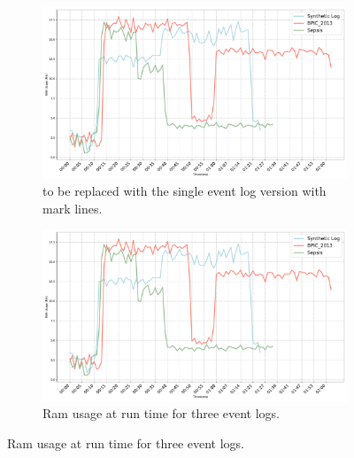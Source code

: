 \begin{figure}[ht]
\centering
\begin{subfigure}{0.49\textwidth}
  \centering
  \includegraphics[width=\textwidth]{content/figures/Ram_usage_per_TS_combined.pdf}
  \caption{to be replaced with the single event log version with mark lines.}
  \label{snr_a}
\end{subfigure}\hfill
\begin{subfigure}{0.49\textwidth}
  \centering
  \includegraphics[width=\textwidth]{content/figures/Ram_usage_per_TS_combined.pdf}
  \caption{Ram usage at run time for three event logs.}
  \label{snr_b}   
\end{subfigure}


\end{figure}

